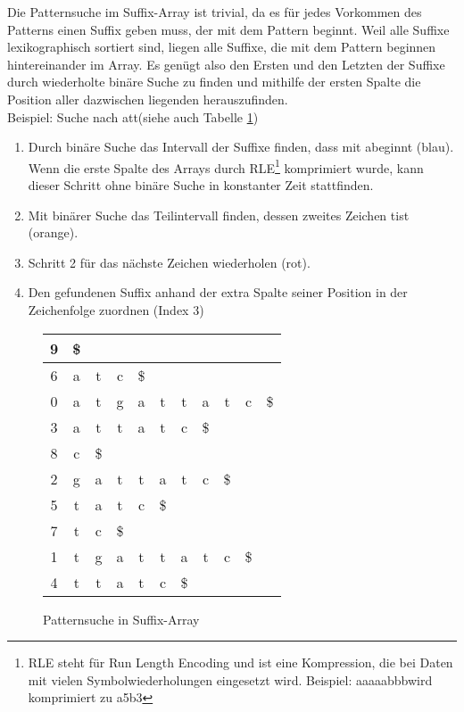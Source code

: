 Die Patternsuche im Suffix-Array ist trivial, da es für jedes Vorkommen des Patterns einen Suffix geben muss, der mit dem Pattern beginnt.
Weil alle Suffixe lexikographisch sortiert sind, liegen alle Suffixe, die mit dem Pattern beginnen hintereinander im Array.
Es genügt also den Ersten und den Letzten der Suffixe durch wiederholte binäre Suche zu finden und mithilfe der ersten Spalte die Position aller dazwischen liegenden herauszufinden.
\\
Beispiel: Suche nach \glqq att\grqq (siehe auch Tabelle \ref{tbl:suffix-array-search})
\begin{enumerate}
	\item Durch binäre Suche das Intervall der Suffixe finden, dass mit \glqq a\grqq beginnt (blau).
		Wenn die erste Spalte des Arrays durch RLE\footnote{RLE steht für Run Length Encoding und ist eine Kompression, die bei Daten mit vielen Symbolwiederholungen eingesetzt wird. Beispiel: \glqq aaaaabbb\grqq wird komprimiert zu \glqq a5b3\grqq}
		komprimiert wurde, kann dieser Schritt ohne binäre Suche in konstanter Zeit stattfinden.
	\item Mit binärer Suche das Teilintervall finden, dessen zweites Zeichen \glqq t\grqq ist (orange).
	\item Schritt 2 für das nächste Zeichen wiederholen (rot).
	\item Den gefundenen Suffix anhand der extra Spalte seiner Position in der Zeichenfolge zuordnen (Index 3)
\end{enumerate}

\begin{figure}[h]
	\begin{center}
		\begin{tabular}{ c || c c c c c c c c c c | }
			\hline
			9 & \$ &   &   &   &   &   &   &   &   &   \\
			\hline
			6 & \cellcolor{SkyBlue} a & \cellcolor{BurntOrange} t & c & \$ &   &   &   &   &   &   \\
			\hline
			0 & \cellcolor{SkyBlue} a & \cellcolor{BurntOrange} t & g & a & t & t & a & t & c & \$ \\
			\hline
			3 & \cellcolor{SkyBlue} a & \cellcolor{BurntOrange} t & \cellcolor{RubineRed} t & a & t & c & \$ &   &   &   \\
			\hline
			8 & c & \$ &   &   &   &   &   &   &   &   \\
			\hline
			2 & g & a & t & t & a & t & c & \$ &   &   \\
			\hline
			5 & t & a & t & c & \$ &   &   &   &   &   \\
			\hline
			7 & t & c & \$ &   &   &   &   &   &   &   \\
			\hline
			1 & t & g & a & t & t & a & t & c & \$ &   \\
			\hline
			4 & t & t & a & t & c & \$ &   &   &   &   \\
			\hline
		\end{tabular}
		\caption{Patternsuche in Suffix-Array}
		\label{tbl:suffix-array-search}
	\end{center}
\end{figure}

